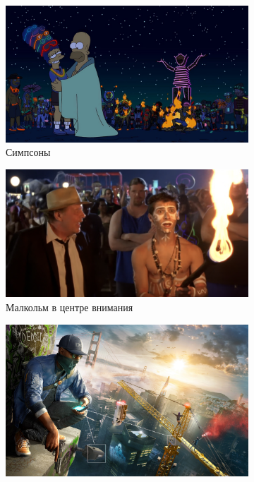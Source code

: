 \documentclass[10pt,a4paper]{report}
\begin{document}
\begin{figure}
\centering
     \begin{subfigure}[b]{0.3\textwidth}
         \label{pic1} 
         \centering
         \includegraphics[width=\textwidth]{images/simpsons1.jpg}
         \caption{Симпсоны}
     \end{subfigure}
     \hfill
     \begin{subfigure}[b]{0.3\textwidth}
         \label{pic2}
         \centering
         \includegraphics[width=\textwidth]{images/malcolm2.jpg}
         \caption{Малкольм в центре внимания}
     \end{subfigure}
     \hfill
     \begin{subfigure}[b]{0.3\textwidth}
         \label{pic3}
         \centering
         \includegraphics[width=\textwidth]{images/watchdogs2.jpeg}

\end{subfigure}
\end{figure}
\end{document}
